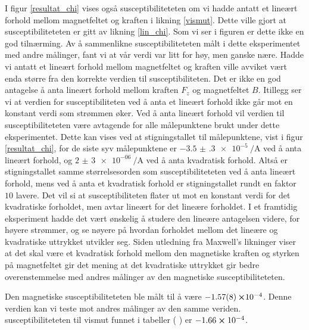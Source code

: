 \documentclass[%
 reprint,
 amsmath,amssymb,
 aps,
 norsk,
]{revtex4-1}
\begin{document}
I figur \vref{resultat_chi} vises også susceptibiliteteten om vi hadde antatt et lineært forhold mellom magnetfeltet og kraften i likning \eqref{vismut}. Dette ville gjort at susceptibiliteteten er gitt av likning \eqref{lin_chi}. Som vi ser i figuren er dette ikke en god tilnærming. Av å sammenlikne susceptibiliteteten målt i dette eksperimentet med andre målinger, fant vi at vår verdi var litt for høy, men ganske nære. Hadde vi antatt et lineært forhold mellom magnetfeltet og kraften ville avviket vært enda større fra den korrekte verdien til susceptibiliteten. Det er ikke en god antagelse å anta lineært forhold mellom kraften $F_z$ og magnetfeltet $B$. Itillegg ser vi at verdien for susceptibiliteten ved å anta et lineært forhold ikke går mot en konstant verdi som strømmen øker. Ved å anta lineært forhold vil verdien til susceptibiliteteten være avtagende for alle målepunktene brukt under dette eksperimentet. Dette kan vises ved at stigningstallet til målepunktene, vist i figur \vref{resultat_chi}, for de siste syv målepunktene er $\SI{-3.5(3)e-5}{\per\ampere}$ ved å anta lineært forhold, og $\SI{2(3)e-06}{\per\ampere}$ ved å anta kvadratisk forhold. Altså er stigningstallet samme størrelsesorden som susceptibiliteteten ved å anta lineært forhold, mens ved å anta et kvadratisk forhold er stigningstallet rundt en faktor $10$ lavere. Det vil si at susceptibiliteten flater ut mot en konstant verdi for det kvadratiske forholdet, men avtar lineært for det lineære forholdet.
I et framtidig eksperiment hadde det vært ønskelig å studere den lineære antagelsen videre, for høyere strømmer, og se nøyere på hvordan forholdet mellom det lineære og kvadratiske uttrykket utvikler seg. Siden utledning fra Maxwell's likninger viser at det skal være et kvadratisk forhold mellom den magnetiske kraften og styrken på magnetfeltet gir det mening at det kvadratiske uttrykket gir bedre overenstemmelse med andres målinger av den magnetiske susceptibiliteteten.
\par
Den magnetiske susceptibiliteteten ble målt til å være $-\SI{1.57\pm0.08}\cross 10^{-4}$. Denne verdien kan vi teste mot andres målinger av den samme veriden. susceptibiliteteten til vismut funnet i tabeller (\cite{noauthor_magnetic_2018} \cite{noauthor_magnetic_nodate}) er $-1.66 \cross 10^{-4}$.
\end{document}
